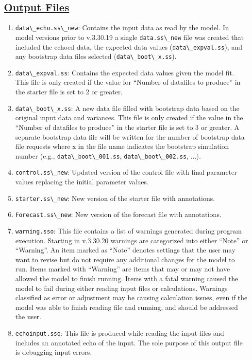 	\subsection[Output Files]{\protect\hyperlink{OutputFilesList}{Output Files}}
	\begin{enumerate}
		\item \verb|data\_echo.ss\_new|: Contains the input data as read by the model. In model versions prior to v.3.30.19 a single \verb|data.ss\_new| file was created that included the echoed data, the expected data values (\verb|data\_expval.ss|), and any bootstrap data files selected (\verb|data\_boot\_x.ss|).
		\item \verb|data\_expval.ss|: Contains the expected data values given the model fit. This file is only created if the value for ``Number of datafiles to produce'' in the starter file is set to 2 or greater.
		\item \verb|data\_boot\_x.ss|: A new data file filled with bootstrap data based on the original input data and variances. This file is only created if the value in the ``Number of datafiles to produce'' in the starter file is set to 3 or greater. A separate bootstrap data file will be written for the number of bootstrap data file requests where x in the file name indicates the bootstrap simulation number (e.g., \verb|data\_boot\_001.ss|, \verb|data\_boot\_002.ss|, ...).
		\item \verb|control.ss\_new|: Updated version of the control file with final parameter values replacing the initial parameter values.
		\item \verb|starter.ss\_new|: New version of the starter file with annotations.
		\item \verb|Forecast.ss\_new|: New version of the forecast file with annotations.
		\item \verb|warning.sso|: This file contains a list of warnings generated during program execution. Starting in v.3.30.20 warnings are categorized into either ``Note'' or ``Warning''. An item marked as ``Note'' denotes settings that the user may want to revise but do not require any additional changes for the model to run. Items marked with ``Warning'' are items that may or may not have allowed the model to finish running. Items with a fatal warning caused the model to fail during either reading input files or calculations. Warnings classified as error or adjustment may be causing calculation issues, even if the model was able to finish reading file and running, and should be addressed the user. 
		\item \verb|echoinput.sso|: This file is produced while reading the input files and includes an annotated echo of the input. The sole purpose of this output file is debugging input errors.

\end{enumerate}
